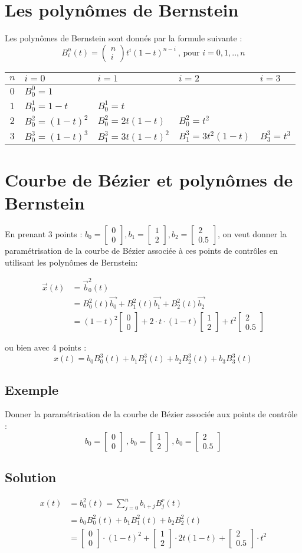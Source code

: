 \documentclass[a4paper,9pt]{extarticle}
\newcommand{\matv}[2]{\begin{bmatrix}#1 \\ #2 \end{bmatrix}}
\newcommand{\binomial}[2]{\begin{pmatrix}#1 \\ #2\end{pmatrix}}
\begin{document}
\section{Les polynômes de Bernstein}

Les polynômes de Bernstein sont donnés par la formule suivante :
$$
B_i^n(t) = \binomial{n}{i}t^i(1-t)^{n-i} \ \text{, pour $i = 0,1,..,n$} 
$$
\begin{center}
\begin{tabular}{|c|l|l|l|l|}
\hline 
$n$ & $i = 0$ & $i = 1$ & $i = 2$ & $i = 3$ \\  \hline
\hline 
$0$ & $B^0_0 = 1$ & & & \\ 
$1$ & $B^1_0 = 1-t$ & $B^1_0 = t$ & & \\ 
$2$ & $B^2_0 = (1-t)^2$ & $B^2_0 = 2t(1-t)$ & $B^2_0 = t^2$ & \\ 
$3$ & $B^3_0 = (1-t)^3$ & $B^3_1 = 3t(1-t)^2$ & $B^3_1 = 3t^2(1-t)$ & $B^3_3 = t^3$ \\ 
\hline 
\end{tabular}
\end{center}

\section{Courbe de Bézier et polynômes de Bernstein}

En prenant 3 points : $b_0 = \matv{0}{0},b_1 = \matv{1}{2},b_2 = \matv{2}{0.5}$, on veut donner la paramétrisation de la courbe de Bézier associée à ces points de contrôles en utilisant les polynômes de Bernstein:

\begin{align*}
\vec{x}(t) &= \vec{b}_0^2(t) \\ 
           &= B_0^2(t) \vec{b_0} + B_1^2(t) \vec{b_1} + B_2^2(t) \vec{b_2} \\
           &= (1-t)^2 \matv{0}{0} + 2 \cdot t \cdot (1-t) \matv{1}{2} + t^2 \matv{2}{0.5}
\end{align*}

ou bien avec 4 points :
$$
x(t) = b_0B_0^3(t)+b_1B_1^3(t)+b_2B_2^3(t)+b_3B_3^3(t)
$$

\subsection*{Exemple}
Donner la paramétrisation de la courbe de Bézier associée aux points de contrôle :
$$
b_0 = \matv{0}{0} \ \text{,} \ b_0 = \matv{1}{2} \ \text{,} \ b_0 = \matv{2}{0.5}
$$
\subsection*{Solution}
\begin{align*}
x(t) &= b_0^2(t) = \sum_{j=0}^{n}b_{i+j}B_j^r(t) \\
     &= b_0B_0^2(t) + b_1B_1^2(t) + b_2B_2^2(t) \\
     &= \matv{0}{0} \cdot (1-t)^2 + \matv{1}{2} \cdot 2t(1-t) + \matv{2}{0.5} \cdot t^2
\end{align*}
\end{document}
